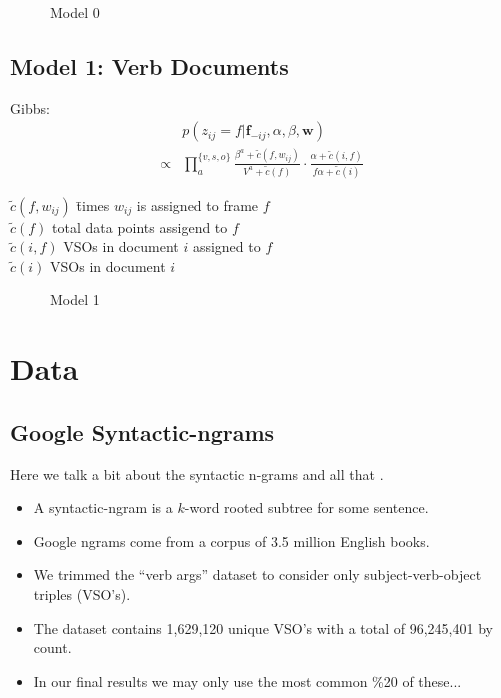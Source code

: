 \documentclass[10pt,twocolumn]{scrartcl}
\begin{document}
\begin{figure}

\caption{Model 0}
\end{figure}

\subsection{Model 1: Verb Documents}
Gibbs:
\begin{align}
&p(z_{ij} = f| \mathbf{f}_{-ij},\alpha,\beta,\mathbf{w})\\
\propto &\prod_a^{\{v,s,o\}}\frac{\beta^a + \tilde{c}(f,w_{ij})}{V^a + \tilde{c}(f)}
        \cdot \frac{\alpha + \tilde{c}(i,f)}{f\alpha+\tilde{c}(i)}
\end{align}

\begin{tabbing}
    $\tilde{c}(f,w_{ij})$ \hspace{10pt}\= times $w_{ij}$ is assigned to frame $f$\\
    $\tilde{c}(f)$                     \> total data points assigend to $f$\\
    $\tilde{c}(i,f)$                   \> VSOs in document $i$ assigned to $f$\\
    $\tilde{c}(i)$                     \> VSOs in document $i$\\ 
\end{tabbing}

\begin{figure}
    
    \caption{Model 1}
\end{figure}


\section{Data}

\subsection{Google Syntactic-ngrams}
Here we talk a bit about the syntactic n-grams and all that \cite{ngrams2013}.
\begin{itemize}
    \item A syntactic-ngram is a $k$-word rooted subtree for some sentence. 
    \item Google ngrams come from a corpus of 3.5 million English books.
    \item We trimmed the ``verb args'' dataset to consider only subject-verb-object triples (VSO's).
    \item The dataset contains 1,629,120 unique VSO's with a total of 96,245,401 by count.
    \item In our final results we may only use the most common \%20 of these...
\end{itemize}
\end{document}
